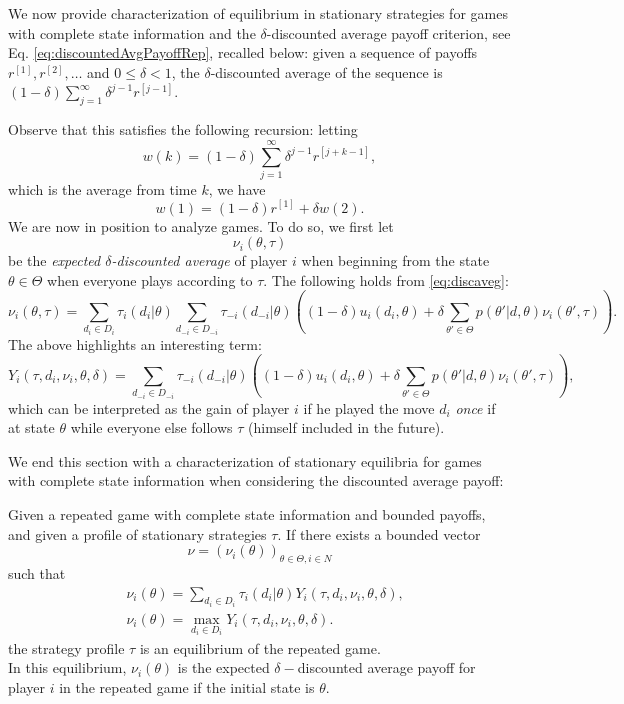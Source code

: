 We now provide characterization of equilibrium in stationary strategies for games with complete state information and the
$\delta$-discounted average payoff criterion, see Eq.  \eqref{eq:discountedAvgPayoffRep}, recalled below:
given a sequence of payoffs $r^{[1]}, r^{[2]}, \ldots$ and $0 \leq \delta < 1$, the $\delta$-discounted average of the sequence is
$(1-\delta) \sum_{j = 1}^{\infty} \delta^{j-1}r^{[j-1]}$.

Observe that this satisfies the following recursion: letting
$$w(k) = (1-\delta) \sum_{j = 1}^{\infty} \delta^{j-1}r^{[j+k-1]},  $$
which is the average from time $k$, we have
\begin{equation}
 w(1)  =  (1-\delta)r^{[1]} + \delta w(2).
\label{eq:discaveg}
\end{equation}
We are now in position to analyze games. To do so, we first let
$$ \nu_i(\theta, \tau) $$
be the \emph{expected $\delta$-discounted average} of player $i$ when beginning from the state $\theta \in \Theta$ when everyone plays according to $\tau$.
The following holds from \eqref{eq:discaveg}:
\begin{equation}
\nu_i(\theta, \tau) = \sum_{d_i \in D_i} \tau_i(d_i | \theta) \sum_{d_{-i} \in D_{-i}} \tau_{-i}(d_{-i} | \theta) \left ( (1-\delta) u_i(d_i, \theta) + \delta \sum_{\theta' \in \Theta}  p(\theta' |d, \theta) \nu_i(\theta', \tau) \right ).
\label{theNuequation}
\end{equation}
The above highlights an interesting term:
$$Y_i(\tau, d_i, \nu_i, \theta, \delta) =  \sum_{d_{-i} \in D_{-i}} \tau_{-i}(d_{-i} | \theta) \left ( (1-\delta) u_i(d_i, \theta) + \delta \sum_{\theta' \in \Theta}  p(\theta' |d, \theta) \nu_i(\theta', \tau) \right ), $$
which can be interpreted as the gain of player $i$ if he played the move $d_i$ \emph{once} if at state $\theta$ while everyone else follows $\tau$ (himself included in the future).

We end this section with a characterization of stationary equilibria for games with complete state information when considering the discounted average payoff:
\begin{theorem}
\label{thm:stateq}
Given a repeated game with complete state information and bounded payoffs, and given a profile of stationary strategies $\tau$. If there exists a bounded vector
$$ \nu = (\nu_i(\theta))_{\theta \in \Theta, i \in N} $$
such that
\begin{align}
& \nu_i(\theta) = \sum_{d_i \in D_i} \tau_i(d_i | \theta) Y_i(\tau, d_i, \nu_i, \theta, \delta), \label{thmStufmathc1}\\
& \nu_i(\theta) = \max_{d_i \in D_i} Y_i(\tau, d_i, \nu_i, \theta, \delta) .\label{thmStufmathc2}
\end{align}
the strategy profile $\tau$ is an equilibrium of the repeated game. \\
In this equilibrium, $\nu_i(\theta)$ is the expected $\delta-$discounted average payoff for player $i$ in the repeated game if the initial state is $\theta$.
\end{theorem}


